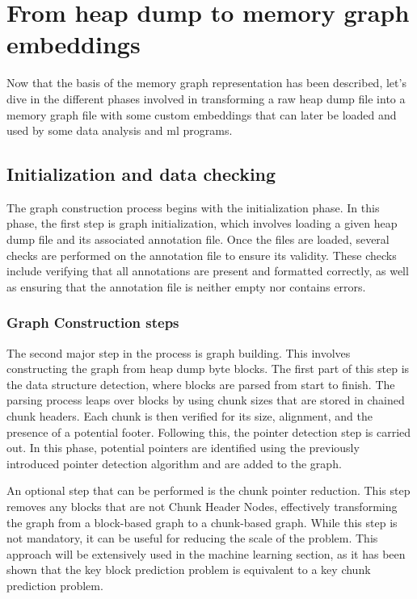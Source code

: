 \section{From heap dump to memory graph embeddings}
Now that the basis of the memory graph representation has been described, let's dive in the different phases involved in transforming a raw heap dump file into a memory graph file with some custom embeddings that can later be loaded and used by some data analysis and \acrshort{ml} programs.

\subsection{Initialization and data checking}

The graph construction process begins with the initialization phase. In this phase, the first step is graph initialization, which involves loading a given heap dump file and its associated annotation file. Once the files are loaded, several checks are performed on the annotation file to ensure its validity. These checks include verifying that all annotations are present and formatted correctly, as well as ensuring that the annotation file is neither empty nor contains errors.

\subsubsection{Graph Construction steps}

The second major step in the process is graph building. This involves constructing the graph from heap dump byte blocks. The first part of this step is the data structure detection, where blocks are parsed from start to finish. The parsing process leaps over blocks by using chunk sizes that are stored in chained chunk headers. Each chunk is then verified for its size, alignment, and the presence of a potential footer. Following this, the pointer detection step is carried out. In this phase, potential pointers are identified using the previously introduced pointer detection algorithm and are added to the graph. 

An optional step that can be performed is the chunk pointer reduction. This step removes any blocks that are not Chunk Header Nodes, effectively transforming the graph from a block-based graph to a chunk-based graph. While this step is not mandatory, it can be useful for reducing the scale of the problem. This approach will be extensively used in the machine learning section, as it has been shown that the key block prediction problem is equivalent to a key chunk prediction problem.

